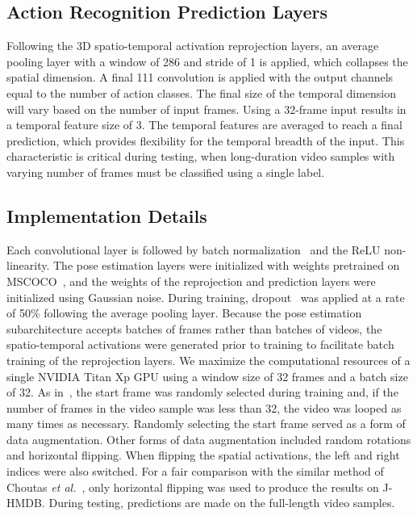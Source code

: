 \documentclass[10pt, conference, compsocconf]{IEEEtran}
\begin{document}
\subsection{Action Recognition Prediction Layers}

Following the 3D spatio-temporal activation reprojection layers, an average pooling layer with a window of 286 and stride of 1 is applied, which collapses the spatial dimension. A final 111 convolution is applied with the output channels equal to the number of action classes. The final size of the temporal dimension will vary based on the number of input frames. Using a 32-frame input results in a temporal feature size of 3. The temporal features are averaged to reach a final prediction, which provides flexibility for the temporal breadth of the input. This characteristic is critical during testing, when long-duration video samples with varying number of frames must be classified using a single label. 

\subsection{Implementation Details}
Each convolutional layer is followed by batch normalization~\cite{ioffe2015batch} and the ReLU non-linearity. The pose estimation layers were initialized with weights pretrained on MSCOCO~\cite{lin2014microsoft}, and the weights of the reprojection and prediction layers were initialized using Gaussian noise. During training, dropout~\cite{srivastava2014dropout} was applied at a rate of 50\% following the average pooling layer. Because the pose estimation subarchitecture accepts batches of frames rather than batches of videos, the spatio-temporal activations were generated prior to training to facilitate batch training of the reprojection layers. We maximize the computational resources of a single NVIDIA Titan Xp GPU using a window size of 32 frames and a batch size of 32. As in~\cite{carreira2017quo}, the start frame was randomly selected during training and, if the number of frames in the video sample was less than 32, the video was looped as many times as necessary. Randomly selecting the start frame served as a form of data augmentation. Other forms of data augmentation included random rotations and horizontal flipping. When flipping the spatial activations, the left and right indices were also switched. For a fair comparison with the similar method of Choutas \textit{et al.}~\cite{choutas2018potion}, only horizontal flipping was used to produce the results on J-HMDB. During testing, predictions are made on the full-length video samples. 
\end{document}
